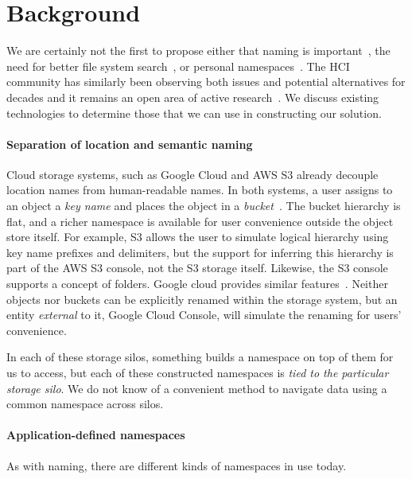 \section{Background}\label{sec:background}

We are certainly not the first to propose either that naming is important~\cite{pike-naming},
the need for better file system search~\cite{gifford1991semantic,mogul1986representing,Seltzer2009}, 
or personal namespaces~\cite{10.1145/155848.155861}.
The HCI community has similarly been observing both issues and potential alternatives for 
decades and it remains an open area of active research~\cite{malone1983how,bergman2019factors,CHS:Medium:2019,vitale2020personal}.
We discuss existing technologies to determine those that we can use in constructing our solution.

\paragraph{Separation of location and semantic naming} 

Cloud storage systems, such as Google Cloud and AWS S3 already decouple location names from human-readable names. 
In both systems, a user assigns to an object a \textit{key name} and places the object in a \textit{bucket}~\cite{google-cloud-storage,aws-s3}. 
The bucket hierarchy is flat, and a richer namespace is available for user convenience outside the object store itself. 
For example, S3 allows the user to simulate logical hierarchy using key name prefixes and delimiters, but the support 
for inferring this hierarchy is part of the AWS S3 console, not the S3 storage itself. 
Likewise, the S3 console supports a concept of folders. 
Google cloud provides similar features~\cite{google-cloud-naming}. Neither objects nor buckets can be explicitly renamed within the storage system, 
but an entity \textit{external} to it, Google Cloud Console, will simulate the renaming for users' convenience.

In each of these storage silos, something builds a namespace on top of them for us to access, but each of these constructed namespaces is \textit{tied to the particular storage silo}. 
We do not know of a convenient method to navigate data using a common namespace across silos. 

\paragraph{Application-defined namespaces}
As with naming, there are different kinds of namespaces in use today.

